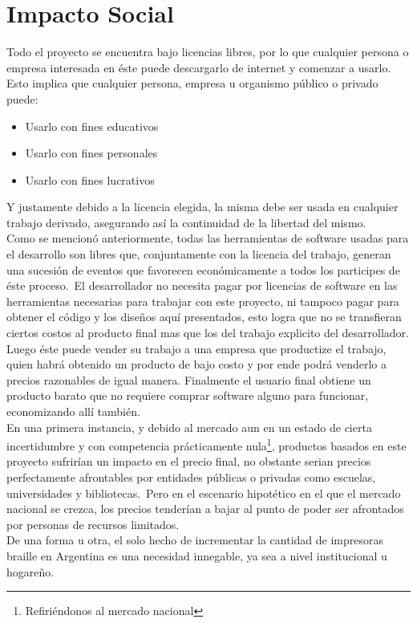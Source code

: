 \chapter{Impacto Social} %

Todo el proyecto se encuentra bajo licencias libres, por lo que cualquier
persona o empresa interesada en \'este puede descargarlo de internet y
comenzar a usarlo. Esto implica que cualquier persona, empresa u organismo
p\'ublico o privado puede:

\begin{itemize}
 \item Usarlo con fines educativos
 \item Usarlo con fines personales
 \item Usarlo con fines lucrativos
\end{itemize}

Y justamente debido a la licencia elegida, la misma debe ser usada en cualquier
trabajo derivado, asegurando as\'i la continuidad de la libertad del mismo.\\

Como se mencion\'o anteriormente, todas las herramientas de software usadas
para el desarrollo son libres que, conjuntamente con la licencia del trabajo,
generan una sucesi\'on de eventos que favorecen econ\'omicamente a todos los
participes de \'este proceso.\
El desarrollador no necesita pagar por licencias de software en las
herramientas necesarias para trabajar con este proyecto, ni tampoco pagar para
obtener el c\'odigo y los dise\~nos aqu\'i presentados, esto logra que no se
transfieran ciertos costos al producto final mas que los del trabajo explicito
del desarrollador. Luego \'este puede vender su trabajo a una empresa que
productize el trabajo, quien habr\'a obtenido un producto de bajo costo y por
ende podr\'a venderlo a precios razonables de igual manera. Finalmente el
usuario final obtiene un producto barato que no requiere comprar software
alguno para funcionar, economizando all\'i tambi\'en.\\

En una primera instancia, y debido al mercado aun en un estado de cierta
incertidumbre y con competencia pr\'acticamente nula\footnote{Refiri\'endonos
al
mercado nacional}, productos basados en este proyecto sufrir\'ian un impacto en
el precio final, no obstante serian precios perfectamente afrontables por
entidades p\'ublicas o privadas como escuelas, universidades y bibliotecas.\ 
Pero en el escenario hipot\'etico en el que el mercado nacional se crezca, los
precios tender\'ian a bajar al punto de poder ser afrontados por personas de
recursos limitados.\\ 

De una forma u otra, el solo hecho de incrementar la cantidad de impresoras
braille en Argentina es una necesidad innegable, ya sea a nivel institucional u
hogare\~no.\\